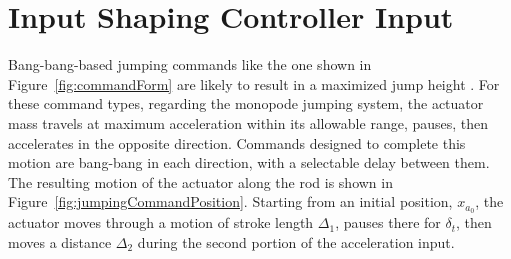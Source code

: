 \section{Input Shaping Controller Input}
\label{sec:controller_input}
Bang-bang-based jumping commands like the one shown in Figure~\ref{fig:commandForm} are likely to result in a maximized jump height \cite{Vaughan2013}. For these command types, regarding the monopode jumping system, the actuator mass travels at maximum acceleration within its allowable range, pauses, then accelerates in the opposite direction. Commands designed to complete this motion are bang-bang in each direction, with a selectable delay between them. The resulting motion of the actuator along the rod is shown in Figure~\ref{fig:jumpingCommandPosition}. Starting from an initial position, $x_{a_0}$, the actuator moves through a motion of stroke length $\Delta_1$, pauses there for $\delta_t$, then moves a distance $\Delta_2$ during the second portion of the acceleration input.
%
